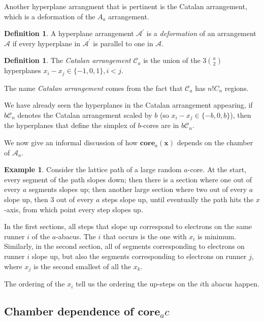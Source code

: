 \documentclass{amsart}[12pt]
\theoremstyle{definition}
\newtheorem{example}[dummy]{Example}
\newtheorem{definition}[dummy]{Definition}
\newcommand{\core}{\mathbf{core}}
\begin{document}
Another hyperplane arrangment that is pertinent is the Catalan arrangement, which is a deformation of the $A_a$ arrangement.

\begin{definition}
A hyperplane arrangement $\mathcal{A}^\prime$ is a \emph{deformation} of an arrangement $\mathcal{A}$ if every hyperplane in $\mathcal{A}^\prime$ is parallel to one in $\mathcal{A}$.
\end{definition}

\begin{definition} \label{def:arrangements}
The \emph{Catalan arrangement} $\mathcal{C}_a$ is the union of the $3\binom{a}{2}$ hyperplanes $x_i-x_j\in\{-1,0,1\}, i<j$.
\end{definition}

The name \emph{Catalan arrangement} comes from the fact that $\mathcal{C}_a$ has $n!C_n$ regions.

We have already seen the hyperplanes in the Catalan arrangement appearing, if $b\mathcal{C}_n$ denotes the Catalan arrangement scaled by $b$ (so $x_i-x_j\in\{-b,0,b\}$), then the hyperplanes that define the simplex of $b$-cores are in $b\mathcal{C}_n$.







We now give an informal discussion of how $\core_a(\mathbf{x})$ depends on the chamber of $\mathcal{A}_a$.


\begin{example}
Consider the lattice path of a large random $a$-core.  At the start, every segment of the path slopes down; then there is a section where one out of every $a$ segments slopes up; then another large section where two out of every $a$ slope up, then 3 out of every $a$ steps slope up, until eventually the path hits the $x$-axis, from which point every step slopes up.

In the first sections, all steps that slope up correspond to electrons on the same runner $i$ of the $a$-abacus.  The $i$ that occurs is the one with $x_i$ is minimum.  Similarly, in the second section, all of segments corresponding to electrons on runner $i$ slope up, but also the segments corresponding to electrons on runner $j$, where $x_j$ is the second smallest of all the $x_k$.

The ordering of the $x_i$ tell us the ordering the up-steps on the $i$th abacus happen.

\end{example}
\subsection{Chamber dependence of \texorpdfstring{$\core_a{c}$}{core(c)}}
\end{document}
